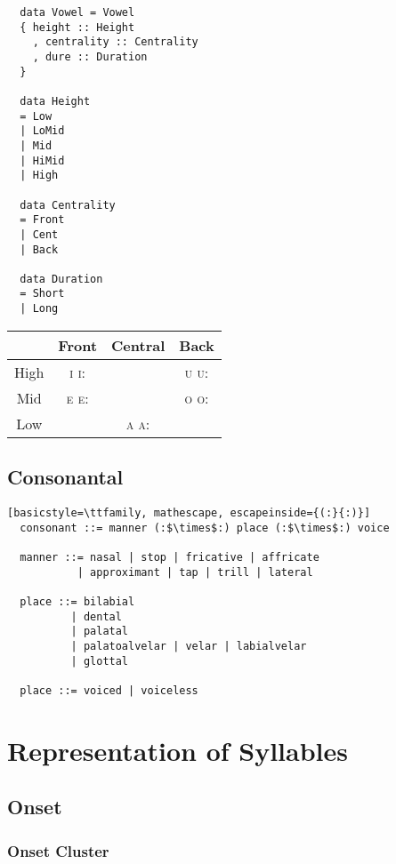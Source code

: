 \documentclass{report}
\begin{document}
\begin{verbatim}
  data Vowel = Vowel
  { height :: Height
    , centrality :: Centrality
    , dure :: Duration
  }

  data Height
  = Low
  | LoMid
  | Mid
  | HiMid
  | High

  data Centrality
  = Front
  | Cent
  | Back

  data Duration
  = Short
  | Long
\end{verbatim}

\begin{tabular}{|c|c|c|c|}
  \hline
  & Front & Central & Back \\
  \hline
  High & \textsc{i i:} & & \textsc{u u:} \\
  \hline
  Mid & \textsc{e e:} & & \textsc{o o:} \\
  \hline
  Low & & \textsc{a a:} & \\
  \hline
\end{tabular}

\section{Consonantal}

\begin{lstlisting}[basicstyle=\ttfamily, mathescape, escapeinside={(:}{:)}]
  consonant ::= manner (:$\times$:) place (:$\times$:) voice

  manner ::= nasal | stop | fricative | affricate
           | approximant | tap | trill | lateral

  place ::= bilabial
          | dental
          | palatal
          | palatoalvelar | velar | labialvelar
          | glottal

  place ::= voiced | voiceless
\end{lstlisting}

\chapter{Representation of Syllables}

\section{Onset}

\subsection{Onset Cluster}
\end{document}
